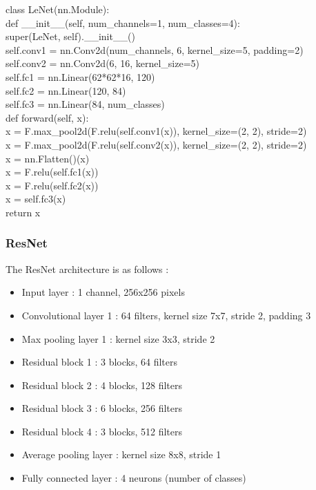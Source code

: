 \documentclass[12pt,a4paper]{article}
\newcommand{\code}[1]{%
    \begin{tcolorbox}[colback=black!10!white,colframe=black]
        #1
    \end{tcolorbox}
}
\begin{document}
\code{
    class LeNet(nn.Module):\\
    \indent\qquad def \_\_init\_\_(self, num\_channels=1, num\_classes=4): \\
    \indent\qquad \qquad super(LeNet, self).\_\_init\_\_() \\
    \indent\qquad \qquad self.conv1 = nn.Conv2d(num\_channels, 6, kernel\_size=5, padding=2) \\
    \indent\qquad \qquad self.conv2 = nn.Conv2d(6, 16, kernel\_size=5) \\
    \indent\qquad \qquad self.fc1   = nn.Linear(62*62*16, 120) \\
    \indent\qquad \qquad self.fc2   = nn.Linear(120, 84) \\
    \indent\qquad \qquad self.fc3   = nn.Linear(84, num\_classes) \\

    \indent\qquad def forward(self, x): \\
    \indent\qquad \qquad x = F.max\_pool2d(F.relu(self.conv1(x)), kernel\_size=(2, 2), stride=2) \\
    \indent\qquad \qquad x = F.max\_pool2d(F.relu(self.conv2(x)), kernel\_size=(2, 2), stride=2) \\
    \indent\qquad \qquad x = nn.Flatten()(x) \\
    \indent\qquad \qquad x = F.relu(self.fc1(x)) \\
    \indent\qquad \qquad x = F.relu(self.fc2(x)) \\
    \indent\qquad \qquad x = self.fc3(x) \\
    \indent\qquad \qquad return x
}


\subsubsection{ResNet}

The ResNet architecture is as follows :

\begin{itemize}[label=-]
    \item Input layer : 1 channel, 256x256 pixels
    \item Convolutional layer 1 : 64 filters, kernel size 7x7, stride 2, padding 3
    \item Max pooling layer 1 : kernel size 3x3, stride 2
    \item Residual block 1 : 3 blocks, 64 filters
    \item Residual block 2 : 4 blocks, 128 filters
    \item Residual block 3 : 6 blocks, 256 filters
    \item Residual block 4 : 3 blocks, 512 filters
    \item Average pooling layer : kernel size 8x8, stride 1
    \item Fully connected layer : 4 neurons (number of classes)
\end{itemize}
\end{document}
